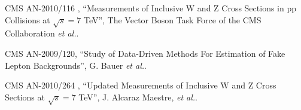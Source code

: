 \documentclass{cmspaper}
\begin{document}
\vspace*{-0.2cm}

 CMS AN-2010/116 , ``Measurements of Inclusive W and Z Cross Sections in pp Collisions at $\sqrt{s}=7$ TeV'', 
The Vector Boson Task Force of the CMS Collaboration  \textit{et al.}.

 CMS AN-2009/120, ``Study of Data-Driven Methods For Estimation of Fake Lepton Backgrounds'',
G. Bauer \textit{et al.}.

 CMS AN-2010/264 , ``Updated Measurements of Inclusive W and Z Cross Sections at $\sqrt{s}=7$ TeV'', 
J. Alcaraz Maestre, \textit{et al.}.
\end{document}
